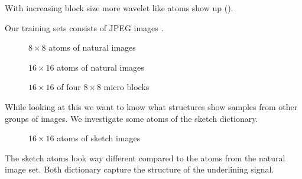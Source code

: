 With increasing block size more wavelet like atoms show up 
(). 

Our training sets consists of JPEG images \label{fig:16jpeg_atoms}. 

\begin{figure}[h]
\centering
{}
\hspace{5mm}
\hspace{5mm}
\hspace{5mm}
\caption{$8\times 8$ atoms of natural images}
\label{fig:8atoms}
\end{figure}
\begin{figure}[h]
\centering
{}
\caption{$16\times 16$ atoms of natural images}
\label{fig:16atoms}
\end{figure}
\begin{figure}[h]
\centering
{}
\caption{$16\times 16$ of four $8\times 8$ micro blocks}
\label{fig:16jpeg_atoms}
\end{figure}
While looking at this we want to know what structures show samples from other
groups of images. We investigate some atoms of the sketch dictionary.
\begin{figure}[h]
\centering
{}
\caption{$16\times 16$ atoms of sketch images}
\label{fig:sketch_atoms}
\end{figure}
The sketch atoms look way different compared to the atoms from the natural
image set. Both dictionary capture the structure of the
underlining signal. 


